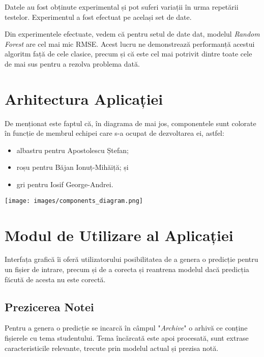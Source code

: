 \documentclass{article}
\begin{document}
Datele au fost obținute experimental și pot suferi variații în urma repetării testelor. Experimentul a fost efectuat pe același set de date.

Din experimentele efectuate, vedem că pentru setul de date dat, modelul \textit{Random Forest} are cel mai mic RMSE. Acest lucru ne demonstrează performanță acestui algoritm față de cele clasice, precum și că este cel mai potrivit dintre toate cele de mai sus pentru a rezolva problema dată.

\section{Arhitectura Aplicației}

De menționat este faptul că, în diagrama de mai jos, componentele sunt colorate în funcție de membrul echipei care s-a ocupat de dezvoltarea ei, astfel:
\begin{itemize}
    \item albastru pentru Apostolescu Ștefan;
    \item roșu pentru Băjan Ionuț-Mihăiță; și
    \item gri pentru Iosif George-Andrei.
\end{itemize}

\vspace{0.3cm}
\begin{center}
    \texttt{[image: images/components\_diagram.png]}
    \label{fig:1}
    \captionsetup{justification=centering,margin=1cm}
\end{center}
\vspace{0.3cm}

\section{Modul de Utilizare al Aplicației}

Interfața grafică îi oferă utilizatorului posibilitatea de a genera o predicție pentru un fișier de intrare, precum și de a corecta și reantrena modelul dacă predicția făcută de acesta nu este corectă.

\subsection{Prezicerea Notei}

Pentru a genera o predicție se incarcă în câmpul "\textit{Archive}" o arhivă ce conține fișierele cu tema studentului. Tema încărcată este apoi procesată, sunt extrase caracteristicile relevante, trecute prin modelul actual și prezisa notă.
\end{document}
